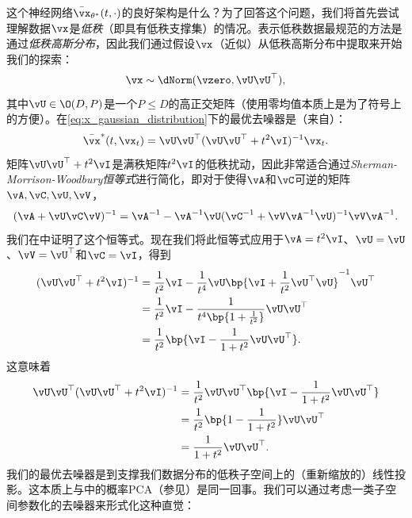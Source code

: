 \documentclass[../../book-main_zh.tex]{subfiles}
\begin{document}
这个神经网络\(\bar{\vx}_{\theta^{\ast}}(t, \cdot)\)的良好架构是什么？为了回答这个问题，我们将首先尝试理解数据\(\vx\)是\textit{低秩}（即具有低秩支撑集）的情况。表示低秩数据最规范的方法是通过\textit{低秩高斯分布}，因此我们通过假设\(\vx\)（近似）从低秩高斯分布中提取来开始我们的探索：
\begin{equation}\label{eq:x_gaussian_distribution}
    \vx \sim \dNorm(\vzero, \vU\vU^{\top}),
\end{equation}
其中\(\vU \in \O(D, P)\)是一个\(P \leq
D\)的高正交矩阵（使用零均值本质上是为了符号上的方便）。在\eqref{eq:x_gaussian_distribution}下的最优去噪器是（来自）：
\begin{equation}\label{eq:optimal denoiser}
    \bar{\vx}^{\ast}(t, \vx_{t}) = \vU\vU^{\top}(\vU\vU^{\top} +
    t^{2}\vI)^{-1}\vx_{t}.
\end{equation}
矩阵\(\vU\vU^{\top} + t^{2}\vI\)是满秩矩阵\(t^{2}\vI\)的低秩扰动，因此非常适合通过\textit{Sherman-Morrison-Woodbury恒等式}进行简化，即对于使得\(\vA\)和\(\vC\)可逆的矩阵\(\vA, \vC, \vU, \vV\)，
\begin{equation}\label{eq:sherman_morrison_woodbury}
    (\vA + \vU\vC\vV)^{-1} = \vA^{-1} - \vA^{-1}\vU(\vC^{-1} +
    \vV\vA^{-1}\vU)^{-1}\vV\vA^{-1}.
\end{equation}
我们在中证明了这个恒等式。现在我们将此恒等式应用于\(\vA = t^{2}\vI\)、\(\vU = \vU\)、\(\vV =
\vU^{\top}\)和\(\vC = \vI\)，得到
\begin{align}
    (\vU\vU^{\top} + t^{2}\vI)^{-1}
    &= \frac{1}{t^{2}}\vI - \frac{1}{t^{4}}\vU\bp{\vI +
    \frac{1}{t^{2}}\vU^{\top}\vU}^{-1}\vU^{\top} \\
    &= \frac{1}{t^{2}}\vI - \frac{1}{t^{4}\bp{1 +
    \frac{1}{t^{2}}}}\vU\vU^{\top} \\
    &= \frac{1}{t^{2}}\bp{\vI - \frac{1}{1 +
    t^{2}}\vU\vU^{\top}}.\label{eq:gaussian_lowrank_inverse_perturbation_simplified}
\end{align}
这意味着
\begin{align}
    \vU\vU^{\top}(\vU\vU^{\top} + t^{2}\vI)^{-1}
    &= \frac{1}{t^{2}}\vU\vU^{\top}\bp{\vI - \frac{1}{1 +
    t^{2}}\vU\vU^{\top}} \\
    &= \frac{1}{t^{2}}\bp{1 - \frac{1}{1 + t^{2}}}\vU\vU^{\top} \\
    &= \frac{1}{1 +
    t^{2}}\vU\vU^{\top}.\label{eq:gaussian_lowrank_denoiser_simplified}
\end{align}
我们的最优去噪器是到支撑我们数据分布的低秩子空间上的（重新缩放的）线性投影。这本质上与中的概率PCA（参见）是同一回事。我们可以通过考虑一类子空间参数化的去噪器来形式化这种直觉：
\end{document}
